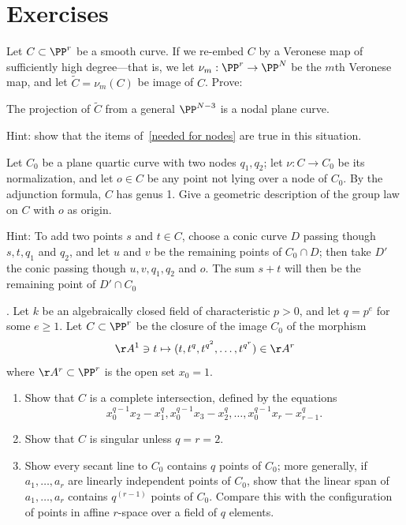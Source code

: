 \section{Exercises}

\begin{exercise}
Let $C\subset \PP^r$ be a smooth curve. If we re-embed $C$ by a Veronese map of sufficiently high degree---that is, we let $\nu_m : \PP^r \to \PP^N$ be the $m$th Veronese map, and let $\widetilde C = \nu_m(C)$ be image of $C$. Prove:

\begin{proposition}\label{positive characteristic nodes}
The projection of $\widetilde C$ from a general $\PP^{N-3}$ is a nodal plane curve.
\end{proposition}

Hint: show that the items of~\ref{needed for nodes}  are true in this situation.
\end{exercise}

\begin{exercise}
Let $C_0$ be a plane quartic curve with two nodes $q_1, q_2$; let $\nu : C \to C_0$ be its normalization, and let $o \in C$ be any point not lying over a node of $C_0$.
By the adjunction formula, $C$ has genus 1. Give a geometric description
of the group law on $C$ with $o$ as origin.

Hint: To add two points $s$ and $t \in C$, choose a conic curve $D$ passing though $s, t, q_1$ and $q_2$, and let $u$ and $v$ be the remaining points of $C_0 \cap D$; then take $D'$ the conic passing though $u, v, q_1, q_2$ and $o$. The sum $s+t$ will then be the remaining point of $D' \cap C_0$
\end{exercise}

\begin{exercise}\label{strange curves} \cite{Rathmann}. Let $k$ be an algebraically closed field of characteristic $p>0$, and let $q=p^e$ for some $e\geq 1$. Let $C\subset \PP^r$
be the closure of the image $C_0$ of the morphism
$$
\AA^1 \ni t \mapsto (t, t^q, t^{q^2}, \dots , t^{q^{r}}) \in \AA^r
$$
where $\AA^r\subset \PP^r$ is the open set $x_0=1$. 
\begin{enumerate}
\item Show that $C$ is a complete intersection, defined by the equations
$$
x_0^{q-1}x_2 - x_1^q, x_0^{q-1}x_3 - x_2^q,\dots, 
x_0^{q-1}x_r - x_{r-1}^q.
$$
\item Show that $C$ is singular unless $q = r = 2$.
\item Show every secant line to $C_0$ contains $q$ points of $C_0$; more generally, if
$a_1, \dots, a_r$ are linearly independent points of $C_0$, show that the linear span of
$a_1, \dots, a_r$ contains $q^{(r-1)}$ points of $C_0$.  Compare this with the configuration of
points in affine $r$-space over a field of $q$ elements.
\end{enumerate}
\end{exercise}

